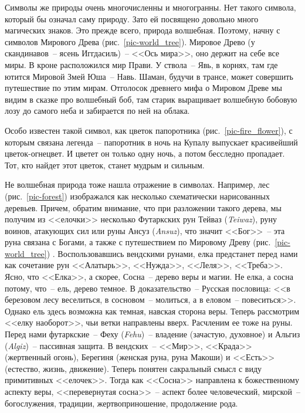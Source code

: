 \documentclass[pscyr,chapters]{hedwork}
\begin{document}
  Символы же природы очень многочисленны и многогранны. Нет такого символа,
  который бы означал саму природу. Зато ей посвящено довольно много магических
  знаков. Это прежде всего, природа волшебная. Поэтому, начну с символов
  Мирового Древа (рис.~\ref{pic-world_tree}). Мировое Древо
  (у скандинавов~-- ясень Иггдасиль)~-- <<Ось мира>>, оно держит на себе все
  миры. В кроне расположился мир Прави. У ствола~-- Явь, в корнях, там где
  ютится Мировой Змей Юша~-- Навь. Шаман, будучи в трансе, может совершить
  путешествие по этим мирам. Отголосок древнего
  мифа о Мировом Древе мы видим в сказке про волшебный боб, там старик
  выращивает волшебную бобовую лозу до самого неба и забирается по ней на
  облака.

  Особо известен такой символ, как цветок папоротника
  (рис.~\ref{pic-fire_flower}), с которым связана легенда~-- папоротник в ночь
  на Купалу выпускает красивейший цветок-огнецвет. И цветет он только одну ночь,
  а потом бесследно пропадает. Тот, кто найдет этот цветок, станет мудрым и
  сильным.

  Не волшебная природа тоже нашла отражение в символах. Например, лес
  (рис.~\ref{pic-forest}) изображался как несколько схематически нарисованных
  деревьев. Причем, обратим внимание, что при разложении такого дерева, мы
  получим из <<елочки>> несколько Футаркских рун Тейваз (\emph{Teiwaz}), руну
  воинов, атакующих сил или руны Ансуз (\emph{Ansuz}), что значит <<Бог>>~-- эта
  руна связана с Богами, а также с путешествием по Мировому Древу
  (рис.~\ref{pic-world_tree}) \cite{5}. Воспользовавшись вендскими рунами, елка
  предстанет перед нами как сочетание рун <<Алатырь>>, <<Нужда>>, <<Леля>>,
  <<Треба>>. Ясно, что <<Елка>>, а скорее, Сосна~-- дерево веры и магии. Не
  елка, а сосна потому, что~-- ель, дерево темное. В доказательство~-- Русская
  пословица: <<в березовом лесу веселиться, в сосновом~-- молиться, а в
  еловом~-- повеситься>>. Однако ель здесь возможна как темная, навская сторона
  веры. Теперь рассмотрим <<елку наоборот>>, чьи ветки направлены вверх.
  Расчленим ее тоже на руны. Перед нами футаркские~-- Феху (\emph{Fehu})~--
  владение (зачастую, духовное) и Альгиз (\emph{Algiz})~-- пассивная защита. В
  вендских~-- <<Мир>>, <<Крада>> (жертвенный огонь), Берегиня (женская руна,
  руна Макоши) и <<Есть>> (естество, жизнь, движение). Теперь понятен сакральный
  смысл с виду примитивных <<елочек>>. Тогда как <<Сосна>> направлена к
  божественному аспекту веры, <<перевернутая сосна>>~-- аспект более
  человеческий, мирской~-- богослужения, традиции, жертвоприношение, продолжение
  рода.
\end{document}
